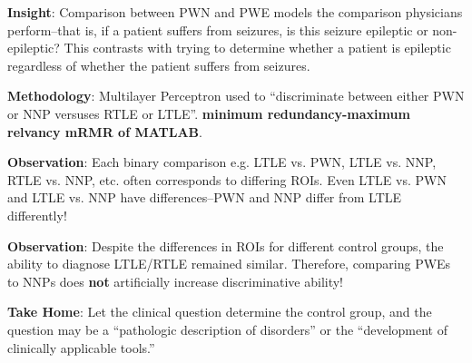 \documentclass{article}
\begin{document}
\textbf{Insight}: Comparison between PWN and PWE models the comparison physicians
perform--that is, if a patient suffers from seizures, is this seizure epileptic
or non-epileptic? This contrasts with trying to determine whether a patient is
epileptic regardless of whether the patient suffers from seizures.

\textbf{Methodology}: Multilayer Perceptron used to ``discriminate between either PWN or
NNP versuses RTLE or LTLE''. \textbf{minimum redundancy-maximum relvancy mRMR of
MATLAB}.

\textbf{Observation}: Each binary comparison e.g. LTLE vs. PWN, LTLE vs. NNP, RTLE vs.
NNP, etc. often corresponds to differing ROIs. Even LTLE vs. PWN and LTLE vs.
NNP have differences--PWN and NNP differ from LTLE differently!

\textbf{Observation}: Despite the differences in ROIs for different control
groups, the ability to diagnose LTLE/RTLE remained similar. Therefore,
comparing PWEs to NNPs does \textbf{not} artificially increase discriminative
ability!

\textbf{Take Home}: Let the clinical question determine the control group, and
the question may be a ``pathologic description of disorders'' or the
``development of clinically applicable tools.''  
\end{document}
